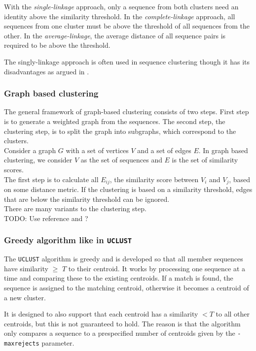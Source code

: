 With the \textit{single-linkage} approach, only a sequence from both clusters
need an identity above the similarity threshold.  In the
\textit{complete-linkage} approach, all sequences from one cluster must be
above the threshold of all sequences from the other.  In the
\textit{average-linkage}, the average distance of all sequence pairs is
required to be above the threshold.

The singly-linkage approach is often used in sequence clustering though it has
its disadvantages as argued in \cite[pp. 62-63]{dong}.

\subsubsection{Graph based clustering}
The general framework of graph-based clustering consists of two steps. First step is to generate a weighted graph from the sequences. The second step, the clustering step, is to split the graph into subgraphs, which correspond to the clusters.\cite[pp. 64-65]{dong} \\
Consider a graph $G$ with a set of vertices $V$ and a set of edges $E$. In graph based clustering, we consider $V$ as the set of sequences and $E$ is the set of similarity scores. \\
The first step is to calculate all $E_{ij}$, the similarity score between $V_i$ and $V_j$, based on some distance metric. If the clustering is based on a similarity threshold, edges that are below the similarity threshold can be ignored. \\
There are many variants to the clustering step.\\
TODO: Use reference \cite{hartuv} and \cite{kawaji}?




\subsubsection{Greedy algorithm like in \texttt{UCLUST}}
The \texttt{UCLUST} algorithm is greedy and is developed so that all member
sequences have similarity $\geq$ $T$ to their centroid.  It works by processing
one sequence at a time and comparing these to the existing centroids. If a
match is found, the sequence is assigned to the matching centroid, otherwise it
becomes a centroid of a new cluster.

It is designed to also support that each centroid has a similarity $<T$ to all
other centroids, but this is not guaranteed to hold. The reason is that the
algorithm only compares a sequence to a prespecified number of centroids given
by the \texttt{-maxrejects} parameter.

